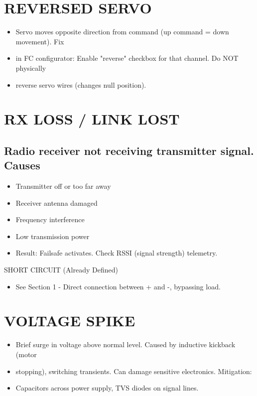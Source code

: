 \documentclass[11pt,letterpaper]{article}
\begin{document}
\section{REVERSED SERVO}

\begin{itemize}
  \item Servo moves opposite direction from command (up command = down movement). Fix
  \item in FC configurator: Enable "reverse" checkbox for that channel. Do NOT physically
  \item reverse servo wires (changes null position).
\end{itemize}

\section{RX LOSS / LINK LOST}

\subsection{Radio receiver not receiving transmitter signal. Causes}

\begin{itemize}
  \item Transmitter off or too far away
  \item Receiver antenna damaged
  \item Frequency interference
  \item Low transmission power
  \item Result: Failsafe activates. Check RSSI (signal strength) telemetry.
\end{itemize}

SHORT CIRCUIT (Already Defined)\par

\begin{itemize}
  \item See Section 1 - Direct connection between + and -, bypassing load.
\end{itemize}

\section{VOLTAGE SPIKE}

\begin{itemize}
  \item Brief surge in voltage above normal level. Caused by inductive kickback (motor
  \item stopping), switching transients. Can damage sensitive electronics. Mitigation:
  \item Capacitors across power supply, TVS diodes on signal lines.
\end{itemize}
\end{document}
